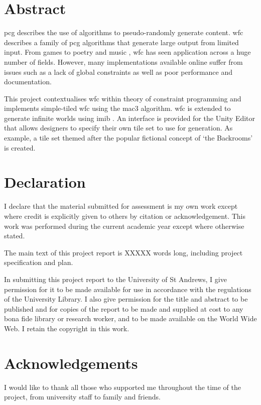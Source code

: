 \section*{Abstract}
\acrfull{pcg} describes the use of algorithms to pseudo-randomly generate content. \acrfull{wfc} describes a family of \acrshort{pcg} algorithms that generate large output from limited input. From games \cite{townscaper,badnorth,cavesofqud} to poetry \cite{WFC_poetry} and music \cite{WFC_music,WFC_music_2}, \acrshort{wfc} has seen application across a huge number of fields. However, many implementations available online suffer from issues such as a lack of global constraints as well as poor performance and documentation.

This project contextualises \acrshort{wfc} within theory of constraint programming and implements simple-tiled \acrshort{wfc} using the \acrlong{mac3} algorithm. \acrshort{wfc} is extended to generate infinite worlds using \acrfull{imib} \cite{Infinite_Modifying_In_Blocks}. An interface is provided for the Unity Editor that allows designers to specify their own tile set to use for generation. As example, a tile set themed after the popular fictional concept of `the Backrooms' is created.


\section*{Declaration}
I declare that the material submitted for assessment is my own work except where credit is explicitly given to others by citation or acknowledgement. This work was performed during the current academic year except where otherwise stated.
\par \vspace{\baselineskip}
The main text of this project report is XXXXX words
long, including project specification and plan.
\par \vspace{\baselineskip}
In submitting this project report to the University of St
Andrews, I give permission for it to be made available
for use in accordance with the regulations of the University
Library. I also give permission for the title and abstract
to be published and for copies of the report to be made and
supplied at cost to any bona fide library or research worker,
and to be made available on the World Wide Web. I retain the copyright in this work.

\section*{Acknowledgements}
I would like to thank all those who supported me throughout the time of the project, from university staff to family and friends.